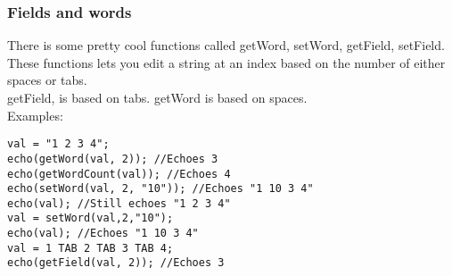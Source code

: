 \begin{frame}[fragile]
\hypertarget{QG-FieldsAndWords}{}
\frametitle{Fields and words}
There is some pretty cool functions called getWord, setWord, getField, setField.\\
These functions lets you edit a string at an index based on the number of either spaces or tabs.\\
getField, is based on tabs. getWord is based on spaces.\\
Examples:
\TS
\begin{lstlisting}
val = "1 2 3 4";
echo(getWord(val, 2)); //Echoes 3
echo(getWordCount(val)); //Echoes 4
echo(setWord(val, 2, "10")); //Echoes "1 10 3 4"
echo(val); //Still echoes "1 2 3 4"
val = setWord(val,2,"10");
echo(val); //Echoes "1 10 3 4"
val = 1 TAB 2 TAB 3 TAB 4;
echo(getField(val, 2)); //Echoes 3
\end{lstlisting}
\end{frame}


